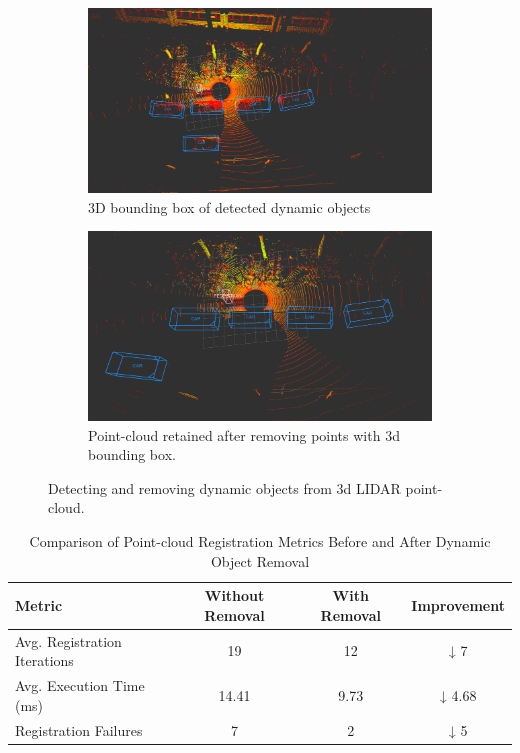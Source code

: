 \begin{figure}[H]
\centering
\begin{subfigure}[t]{0.47\textwidth}
	\includegraphics[width=\linewidth]{images/object_detection.png}
	\caption{3D bounding box of detected dynamic objects }
	\label{fig:3d-box-dynamic-object}
\end{subfigure}
\hfill
\begin{subfigure}[t]{0.47\textwidth}
	\includegraphics[width=\linewidth]{images/object_detection_remove.png}
	\caption{ Point-cloud retained after removing points with 3d bounding box.
	}
	\label{fig:3d-box-dynamic-object-removal}
\end{subfigure}
\caption[Detecting and removing dynamic objects from 3d LIDAR point-cloud]{Detecting and removing dynamic objects from 3d LIDAR point-cloud.}
\label{fig:dynamic-object-removal}
\end{figure}

\begin{table}[H]
	\centering
	\renewcommand{\arraystretch}{0.4}
	\setlength{\tabcolsep}{10pt}
	\caption{Comparison of Point-cloud Registration Metrics Before and After Dynamic Object Removal}
	\label{tab:dynamic_removal_stats}
	\begin{tabular}{@{}lccc@{}}
		\toprule
		\textbf{Metric} & \textbf{Without Removal} & \textbf{With Removal} & \textbf{Improvement} \\
		\midrule
		Avg. Registration Iterations & 19 & 12  & ↓ 7 \\
		Avg. Execution Time (ms)     & 14.41 & 9.73  & ↓ 4.68 \\
		Registration Failures        & 7     & 2     & ↓ 5 \\
		\bottomrule
	\end{tabular}
\end{table}

